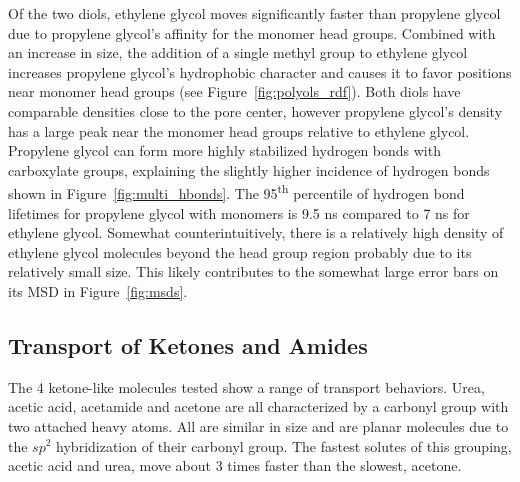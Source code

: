 \documentclass[journal=jpcbfk,manuscript=article]{achemso}
\begin{document}
  Of the two diols, ethylene glycol moves significantly faster than propylene
  glycol due to propylene glycol's affinity for the monomer head groups.
  Combined with an increase in size, the addition of a single methyl group to
  ethylene glycol increases propylene glycol's hydrophobic character and causes
  it to favor positions near monomer head groups (see Figure~\ref{fig:polyols_rdf}).
  Both diols have comparable densities close to the pore center, however propylene
  glycol's density has a large peak near the monomer head groups relative to 
  ethylene glycol. Propylene glycol can form more highly stabilized hydrogen 
  bonds with carboxylate groups, explaining the slightly higher incidence of 
  hydrogen bonds shown in Figure~\ref{fig:multi_hbonds}. The 95\textsuperscript{th}
  percentile of hydrogen bond lifetimes for propylene glycol with monomers is 
  9.5 ns
  compared to 7 ns for ethylene glycol. 
  Somewhat counterintuitively, there is a 
  relatively high density of ethylene glycol molecules beyond the head group region
  probably due to its relatively small size. This likely contributes to the somewhat
  large error bars on its MSD in Figure~\ref{fig:msds}. 

  \subsection{Transport of Ketones and Amides}
  
  The 4 ketone-like molecules tested show a range of transport behaviors. 
  Urea, acetic acid, acetamide and acetone are all characterized by
  a carbonyl group with two attached heavy atoms. All are similar in size and
  are planar molecules due to the $sp^2$ hybridization of their carbonyl group. 
  The fastest solutes of this grouping, acetic acid and urea, move about 3
  times faster than the slowest, acetone.
  
\end{document}

